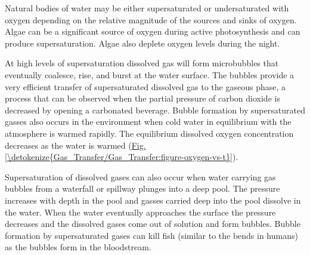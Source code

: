 \documentclass[letterpaper,10pt,english]{sphinxmanual}
\begin{document}
Natural bodies of water may be either supersaturated or undersaturated with oxygen depending on the relative magnitude of the sources and sinks of oxygen. Algae can be a significant source of oxygen during active photosynthesis and can produce supersaturation. Algae also deplete oxygen levels during the night.

At high levels of supersaturation dissolved gas will form microbubbles that eventually coalesce, rise, and burst at the water surface. The bubbles provide a very efficient transfer of supersaturated dissolved gas to the gaseous phase, a process that can be observed when the partial pressure of carbon dioxide is decreased by opening a carbonated beverage. Bubble formation by supersaturated gasses also occurs in the environment when cold water in equilibrium with the atmosphere is warmed rapidly. The equilibrium dissolved oxygen concentration decreases as the water is warmed (\hyperref[\detokenize{Gas_Transfer/Gas_Transfer:figure-oxygen-vs-t}]{Fig.\@ \ref{\detokenize{Gas_Transfer/Gas_Transfer:figure-oxygen-vs-t}}}).

Supersaturation of dissolved gases can also occur when water carrying gas bubbles from a waterfall or spillway plunges into a deep pool. The pressure increases with depth in the pool and gasses carried deep into the pool dissolve in the water. When the water eventually approaches the surface the pressure decreases and the dissolved gases come out of solution and form bubbles. Bubble formation by supersaturated gases can kill fish (similar to the bends in humans) as the bubbles form in the bloodstream.
\end{document}
